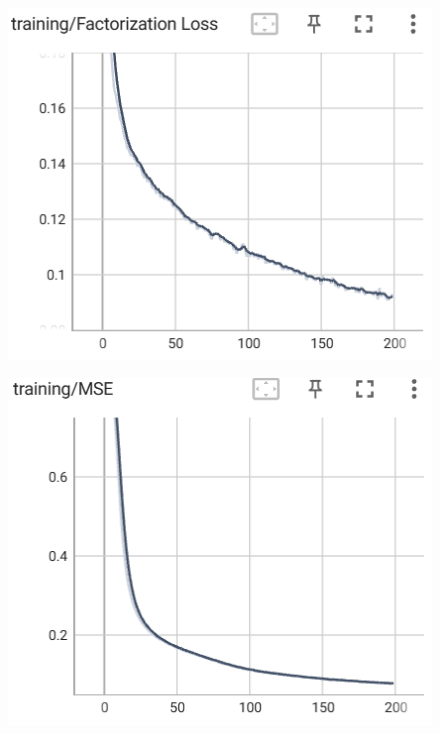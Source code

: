 \documentclass[12pt]{article}
\begin{document}
\begin{enumerate}
    \begin{figure}[htbp]
	\centering
	\begin{minipage}{0.4\linewidth}
		\centering
		\includegraphics[width=0.9\linewidth]{./figs/factorization_loss_50_50.png}
		\label{pic one}%
	\end{minipage}
	\begin{minipage}{0.4\linewidth}
		\centering
		\includegraphics[width=0.9\linewidth]{./figs/mse_50_50.png}
		\label{pic two}%
	\end{minipage}
	\begin{minipage}{0.4\linewidth}
		\centering

\end{minipage}
\end{figure}
\end{enumerate}
\end{document}
